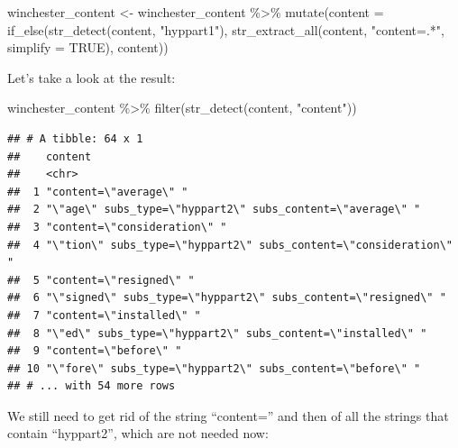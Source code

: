 \documentclass[
]{article}
\newenvironment{Shaded}{\begin{snugshade}}{\end{snugshade}}
\newcommand{\AttributeTok}[1]{\textcolor[rgb]{0.77,0.63,0.00}{#1}}
\newcommand{\ConstantTok}[1]{\textcolor[rgb]{0.00,0.00,0.00}{#1}}
\newcommand{\FunctionTok}[1]{\textcolor[rgb]{0.00,0.00,0.00}{#1}}
\newcommand{\NormalTok}[1]{#1}
\newcommand{\OtherTok}[1]{\textcolor[rgb]{0.56,0.35,0.01}{#1}}
\newcommand{\SpecialCharTok}[1]{\textcolor[rgb]{0.00,0.00,0.00}{#1}}
\newcommand{\StringTok}[1]{\textcolor[rgb]{0.31,0.60,0.02}{#1}}
\begin{document}
\begin{Shaded}
\begin{Highlighting}[]
\NormalTok{winchester\_content }\OtherTok{\textless{}{-}}\NormalTok{ winchester\_content }\SpecialCharTok{\%\textgreater{}\%} 
  \FunctionTok{mutate}\NormalTok{(}\AttributeTok{content =} \FunctionTok{if\_else}\NormalTok{(}\FunctionTok{str\_detect}\NormalTok{(content, }\StringTok{"hyppart1"}\NormalTok{), }
                           \FunctionTok{str\_extract\_all}\NormalTok{(content, }\StringTok{"content=.*"}\NormalTok{, }\AttributeTok{simplify =} \ConstantTok{TRUE}\NormalTok{), }
\NormalTok{                           content))}
\end{Highlighting}
\end{Shaded}

Let's take a look at the result:

\begin{Shaded}
\begin{Highlighting}[]
\NormalTok{winchester\_content }\SpecialCharTok{\%\textgreater{}\%} 
  \FunctionTok{filter}\NormalTok{(}\FunctionTok{str\_detect}\NormalTok{(content, }\StringTok{"content"}\NormalTok{))}
\end{Highlighting}
\end{Shaded}

\begin{verbatim}
## # A tibble: 64 x 1
##    content                                                          
##    <chr>                                                            
##  1 "content=\"average\" "                                           
##  2 "\"age\" subs_type=\"hyppart2\" subs_content=\"average\" "       
##  3 "content=\"consideration\" "                                     
##  4 "\"tion\" subs_type=\"hyppart2\" subs_content=\"consideration\" "
##  5 "content=\"resigned\" "                                          
##  6 "\"signed\" subs_type=\"hyppart2\" subs_content=\"resigned\" "   
##  7 "content=\"installed\" "                                         
##  8 "\"ed\" subs_type=\"hyppart2\" subs_content=\"installed\" "      
##  9 "content=\"before\" "                                            
## 10 "\"fore\" subs_type=\"hyppart2\" subs_content=\"before\" "       
## # ... with 54 more rows
\end{verbatim}

We still need to get rid of the string ``content='' and then of all the strings that contain ``hyppart2'',
which are not needed now:
\end{document}
